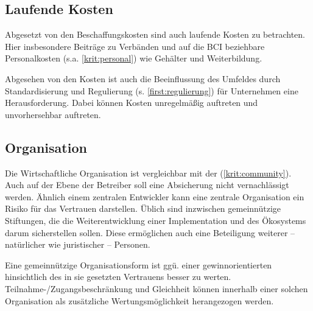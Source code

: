 \subsection{Laufende Kosten}

Abgesetzt von den Beschaffungskosten sind auch laufende Kosten zu betrachten.
Hier insbesondere Beiträge zu Verbänden und auf die \gls{BCI} beziehbare Personalkosten (s.a. \ref{krit:personal}) wie Gehälter und Weiterbildung.

Abgesehen von den Kosten ist auch die Beeinflussung des Umfeldes durch
Standardisierung und Regulierung (\label{regulierung}s. \ref{first:regulierung}) für Unternehmen eine Herausforderung.
Dabei können Kosten unregelmäßig auftreten und unvorhersehbar auftreten.

\subsection{Organisation}

Die Wirtschaftliche Organisation ist vergleichbar mit der  (\ref{krit:community}).
Auch auf der Ebene der Betreiber soll eine Absicherung nicht vernachlässigt werden.
Ähnlich einem zentralen Entwickler kann eine zentrale Organisation ein Risiko für das Vertrauen darstellen.
Üblich sind inzwischen gemeinnützige Stiftungen, die die Weiterentwicklung einer Implementation und des Ökosystems darum sicherstellen sollen.
Diese ermöglichen auch eine Beteiligung weiterer -- natürlicher wie juristischer -- Personen.

Eine gemeinnützige Organisationsform ist ggü. einer gewinnorientierten hinsichtlich des in sie gesetzten Vertrauens besser zu werten.
Teilnahme-/Zugangsbeschränkung und Gleichheit können innerhalb einer solchen Organisation als zusätzliche Wertungsmöglichkeit herangezogen werden.
